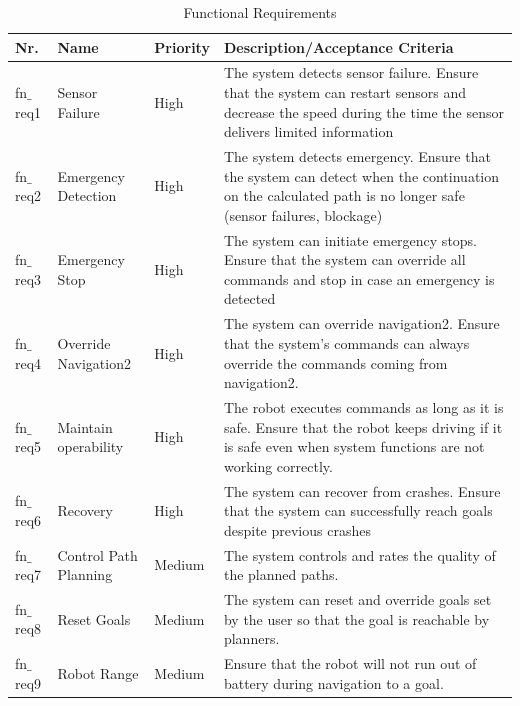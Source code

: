 \begin{table}[h!]
\caption{Functional Requirements}
	\begin{tabular}{| m{} | m{}| m{} | m{}|} 
  	\hline
  	Nr. & Name & Priority & Description/Acceptance Criteria \\ 
  	\hline
  	fn$\_$req1 & Sensor Failure & High & The system detects sensor failure. Ensure that the system can restart sensors and decrease the speed during the time the sensor delivers limited information \\ 
  	\hline
  	fn$\_$req2 & Emergency Detection & High & The system detects emergency. Ensure that the system can detect when the continuation on the calculated path is no longer safe (sensor failures, blockage) \\
  	\hline
  	fn$\_$req3 & Emergency Stop & High & The system can initiate emergency stops. Ensure that the system can override all commands and stop in case an emergency is detected \\
  	\hline  	
  	fn$\_$req4 & Override Navigation2 & High & The system can override navigation2. Ensure that the system's commands can always override the commands coming from navigation2. \\
  	\hline
  	fn$\_$req5 & Maintain operability & High & The robot executes commands as long as it is safe. Ensure that the robot keeps driving if it is safe even when system functions are not working correctly. \\
  	\hline
  	fn$\_$req6 & Recovery & High &  The system can recover from crashes. Ensure that the system can successfully reach goals despite previous crashes\\ 
  	\hline  
  	fn$\_$req7 & Control Path Planning & Medium & The system controls and rates the quality of the planned paths. \\
  	\hline	
  	fn$\_$req8 & Reset Goals & Medium & The system can reset and override goals set by the user so that the goal is reachable by planners. \\
  	\hline
  	fn$\_$req9 & Robot Range & Medium & Ensure that the robot will not run out of battery during navigation to a goal.  \\	
  	\hline
	\end{tabular}
\end{table}


